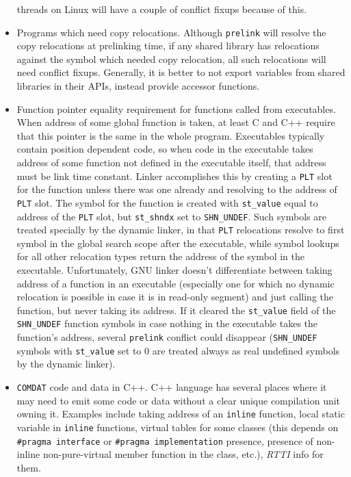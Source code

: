 \documentclass[twoside]{article}
\def\tts#1{\texttt{\small #1}}
\begin{document}
\begin{itemize}
threads on Linux will have a couple of conflict fixups because of this.
\item Programs which need copy relocations.  Although \tts{prelink} will
resolve the copy relocations at prelinking time, if any shared library
has relocations against the symbol which needed copy relocation, all such
relocations will need conflict fixups.  Generally, it is better to not
export variables from shared libraries in their APIs, instead provide
accessor functions.
\item Function pointer equality requirement for functions called from
executables.  When address of some global function is taken, at least
C and C++ require that this pointer is the same in the whole program.
Executables typically contain position dependent code, so when code in the
executable takes address of some function not defined in the executable itself,
that address must be link time constant.  Linker accomplishes this by
creating a \tts{PLT} slot for the function unless there was one already
and resolving to the address of \tts{PLT} slot.  The symbol for the function
is created with \tts{st\_value} equal to address of the \tts{PLT} slot,
but \tts{st\_shndx} set to \tts{SHN\_UNDEF}.  Such symbols are treated
specially by the dynamic linker, in that \tts{PLT} relocations
resolve to first symbol in the global search scope after the executable,
while symbol lookups for all other relocation types return the
address of the symbol in the executable.  Unfortunately, GNU linker doesn't
differentiate between taking address of a function in an executable (especially
one for which no dynamic relocation is possible in case it is in read-only
segment) and just calling the function, but never taking its address.
If it cleared the \tts{st\_value} field of the \tts{SHN\_UNDEF} function symbols
in case nothing in the executable takes the function's address, several \tts{prelink}
conflict could disappear (\tts{SHN\_UNDEF} symbols with \tts{st\_value} set
to 0 are treated always as real undefined symbols by the dynamic linker).
\item \tts{COMDAT} code and data in C++.  C++ language has several places where
it may need to emit some code or data without a clear unique
compilation unit owning it.  Examples include taking address of an
\tts{inline} function, local static variable in \tts{inline} functions,
virtual tables for some classes (this depends on \tts{\#pragma interface}
or \tts{\#pragma implementation} presence, presence of non-inline
non-pure-virtual member function in the class, etc.), {\sl RTTI} info for them.

\end{itemize}
\end{document}
